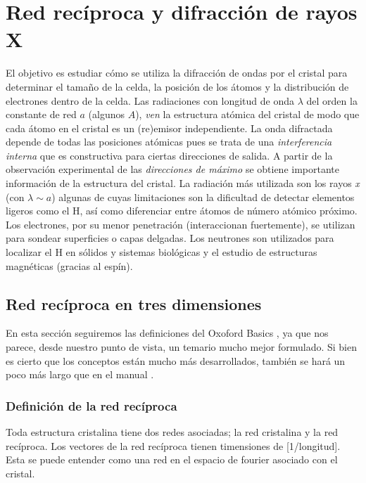 \chapter{Red recíproca y difracción de rayos X} \label{Ch:02}

El objetivo es estudiar cómo se utiliza la difracción de ondas por el cristal para determinar el tamaño de la celda, la posición de los átomos y la distribución de electrones dentro de la celda. Las radiaciones con longitud de onda $\lambda$ del orden la constante de red $a$   (algunos $ A$), {\it ven} la estructura atómica del cristal de modo que cada átomo en el cristal es un (re)emisor independiente. La onda difractada depende de todas las posiciones atómicas pues se trata de una \textit{interferencia interna} que es constructiva para ciertas direcciones de salida. A partir de la observación experimental de las \textit{direcciones de máximo} se obtiene importante información de la estructura del cristal. La radiación más utilizada son los rayos {\it x} (con $\lambda \sim a$) algunas de cuyas limitaciones son la dificultad de detectar elementos ligeros como el H, así como diferenciar entre átomos de número atómico próximo. Los electrones, por su menor penetración (interaccionan fuertemente), se utilizan para sondear superficies o capas delgadas. Los neutrones son utilizados para localizar el H en sólidos y sistemas biológicas y el estudio de estructuras magnéticas (gracias al espín).

\section{Red recíproca en tres dimensiones}

En esta sección seguiremos las definiciones del Oxoford Basics \cite{Oxford_Solid_State}, ya que nos parece, desde nuestro punto de vista, un temario mucho mejor formulado. Si bien es cierto que los conceptos están mucho más desarrollados, también se hará un poco más largo que en el manual \cite{Fisica_del_Estado_Solido}. 

\subsection{Definición de la red recíproca}

Toda estructura cristalina tiene dos redes asociadas; la red cristalina y la red recíproca. Los vectores de la red recíproca tienen timensiones de [1/longitud]. Esta se puede entender como una red en el espacio de fourier asociado con el cristal.


